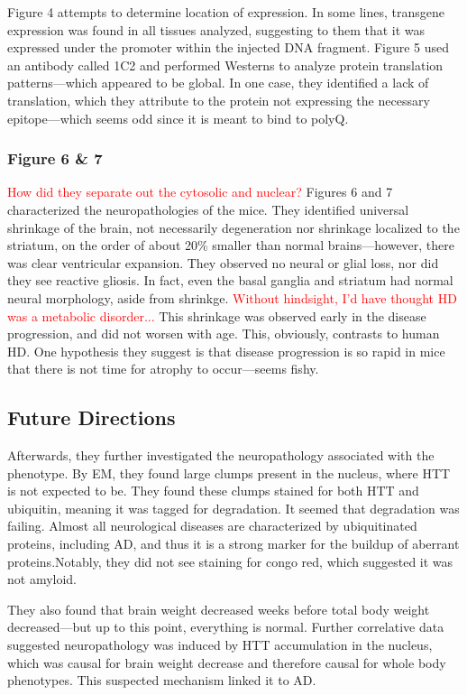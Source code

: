 \documentclass[12pt]{report}
\begin{document}
 Figure 4 attempts to determine location of expression. In some lines, transgene expression was found in all tissues analyzed, suggesting to them that it was expressed under the promoter within the injected DNA fragment. Figure 5 used an antibody called 1C2 and performed Westerns to analyze protein translation patterns---which appeared to be global. In one case, they identified a lack of translation, which they attribute to the protein not expressing the necessary epitope---which seems odd since it is meant to bind to polyQ. 

\subsubsection{Figure 6 \& 7}

\textcolor{red}{How did they separate out the cytosolic and nuclear?} Figures 6 and 7 characterized the neuropathologies of the mice. They identified universal shrinkage of the brain, not necessarily degeneration nor shrinkage localized to the striatum, on the order of about 20\% smaller than normal brains---however, there was clear ventricular expansion. They observed no neural or glial loss, nor did they see reactive gliosis. In fact, even the basal ganglia and striatum had normal neural morphology, aside from shrinkge. \textcolor{red}{Without hindsight, I'd have thought HD was a metabolic disorder...} This shrinkage was observed early in the disease progression, and did not worsen with age. This, obviously, contrasts to human HD. One hypothesis they suggest is that disease progression is so rapid in mice that there is not time for atrophy to occur---seems fishy. 

\subsection{Future Directions}
Afterwards, they further investigated the neuropathology associated with the phenotype. By EM, they found large clumps present in the nucleus, where HTT is not expected to be. They found these clumps stained for both HTT and ubiquitin, meaning it was tagged for degradation. It seemed that degradation was failing. Almost all neurological diseases are characterized by ubiquitinated proteins, including AD, and thus it is a strong marker for the buildup of aberrant proteins.Notably, they did not see staining for congo red, which suggested it was not amyloid. \newline

They also found that brain weight decreased weeks before total body weight decreased---but up to this point, everything is normal. Further correlative data suggested neuropathology was induced by HTT accumulation in the nucleus, which was causal for brain weight decrease and therefore causal for whole body phenotypes. This suspected mechanism linked it to AD.\newline
\end{document}
